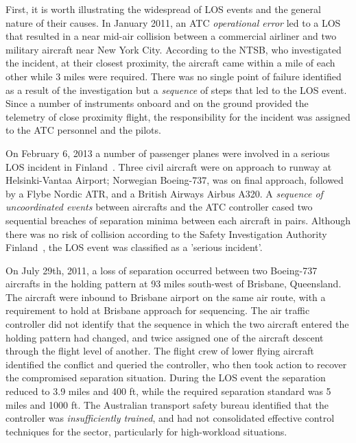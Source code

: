 \documentclass[letter,onecolumn,12pt]{aiaa-tc}
\newcommand{\1}{1_n}
\begin{document}
First, it is worth illustrating the widespread of LOS events and the general nature of their causes. In January 2011, an ATC \emph{operational error} led to a LOS that resulted in a near mid-air collision  between a commercial airliner and two military aircraft near New York City. According to the NTSB\cite{OIG_AR2013}, who investigated the incident, at their closest proximity, the aircraft came within a mile of each other while 3 miles were required. There was no single point of failure identified as a result of the investigation but a \emph{sequence} of steps that led to the LOS event. Since a number of instruments onboard and on the ground provided the telemetry of close proximity flight, the responsibility for the incident was assigned to the ATC personnel and the pilots.

On February 6, 2013  a number of  passenger planes were involved in a serious LOS incident in Finland~\cite{Vantaa_IR2013}.  Three civil aircraft were on approach to runway at Helsinki-Vantaa Airport; Norwegian Boeing-737, was on final approach, followed by a Flybe Nordic ATR, and a British Airways Airbus A320. A \emph{sequence of uncoordinated events} between aircrafts and the ATC controller cased two sequential breaches of separation minima between each aircraft in pairs. Although there was no risk of collision according to the Safety Investigation Authority Finland~\cite{Vantaa_IR2013}, the LOS event was classified as a 'serious incident'.

On July 29th, 2011, a loss of separation occurred between two Boeing-737 aircrafts in the holding pattern at 93 miles south-west of Brisbane, Queensland\cite{Brisbane_ATSR2011}. The aircraft were inbound to Brisbane airport on the same air route, with a requirement to hold at Brisbane approach for sequencing. The air traffic controller did not identify that the sequence in which the two aircraft entered the holding pattern had changed, and twice assigned one of the aircraft descent through the flight level of another. The flight crew of lower flying aircraft identified the conflict and queried the controller, who then took action to recover the compromised separation situation. During the LOS event the separation reduced to 3.9 miles and 400 ft, while the required separation standard was 5 miles and 1000 ft. The Australian transport safety bureau identified that the controller was \emph{insufficiently trained}, and had not consolidated effective control techniques for the sector, particularly for high-workload situations.
\end{document}
